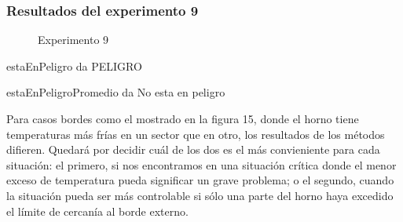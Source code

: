 
\subsubsection{Resultados del experimento 9}

\begin{figure}[ht]
\begin{center}
\caption{Experimento 9}
\end{center}
\end{figure}

\par estaEnPeligro da PELIGRO
\par estaEnPeligroPromedio da No esta en peligro

\par Para casos bordes como el mostrado en la figura 15, donde el horno tiene temperaturas más frías en un sector que en otro, los resultados de los métodos difieren. Quedará por decidir cuál de los dos es el más convieniente para cada situación: el primero, si nos encontramos en una situación crítica donde el menor exceso de temperatura pueda significar un grave problema; o el segundo, cuando la situación pueda ser más controlable si sólo una parte del horno haya excedido el límite de cercanía al borde externo.



